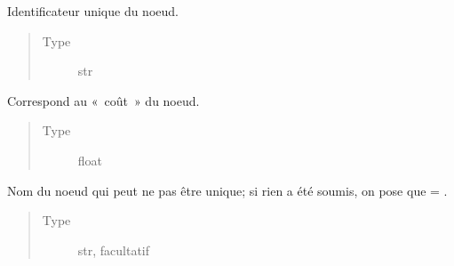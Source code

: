 \documentclass[letterpaper,10pt,french]{sphinxmanual}
\begin{document}
\begin{fulllineitems}
\begin{quote}
\begin{description}
\begin{itemize}
\end{itemize}

\end{description}\end{quote}

\begin{fulllineitems}
\label{\detokenize{index:StrategyTree.Observation._id}}
Identificateur unique du noeud.
\begin{quote}\begin{description}
\item[{Type}] \leavevmode
str

\end{description}\end{quote}

\end{fulllineitems}


\begin{fulllineitems}
\label{\detokenize{index:StrategyTree.Observation._cost}}
Correspond au « coût » du noeud.
\begin{quote}\begin{description}
\item[{Type}] \leavevmode
float

\end{description}\end{quote}

\end{fulllineitems}


\begin{fulllineitems}
\label{\detokenize{index:StrategyTree.Observation._name}}
Nom du noeud qui peut ne pas être unique; si rien a été soumis, on pose
que  = .
\begin{quote}\begin{description}
\item[{Type}] \leavevmode
str, facultatif

\end{description}\end{quote}


\end{fulllineitems}
\end{fulllineitems}
\end{document}
